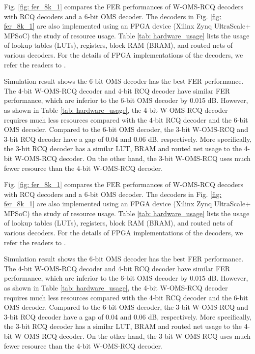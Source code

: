 \documentclass [PhD] {uclathes}
\begin{document}
Fig. \ref{fig: fer_8k_1} compares the FER performances of W-OMS-RCQ decoders with RCQ decoders and a 6-bit OMS decoder. The decoders in Fig. \ref{fig: fer_8k_1} are also implemented using an FPGA device (Xilinx Zynq
UltraScale+ MPSoC) the study of resource usage. Table \ref{tab: hardware_usage} lists the usage of lookup tables (LUTs), registers, block RAM (BRAM), and routed nets of various decoders. For the details of FPGA implementations of the decoders, we refer the readers to \cite{terrill2021fpga}. 

Simulation result shows the 6-bit OMS decoder has the best FER performance. The 4-bit W-OMS-RCQ decoder and 4-bit RCQ decoder have similar FER performance, which are inferior to the 6-bit OMS decoder by 0.015 dB. However, as shown in Table \ref{tab: hardware_usage}, the 4-bit W-OMS-RCQ decoder requires much less resources compared with the 4-bit RCQ decoder and the 6-bit OMS decoder. Compared to the 6-bit OMS decoder, the 3-bit W-OMS-RCQ and 3-bit RCQ decoder have a gap of 0.04 and 0.06 dB, respectively. More specifically, the 3-bit RCQ decoder has a similar LUT, BRAM and routed net usage to the 4-bit W-OMS-RCQ decoder. On the other hand, the 3-bit W-OMS-RCQ uses much fewer resource than the 4-bit W-OMS-RCQ decoder.




Fig. \ref{fig: fer_8k_1} compares the FER performances of W-OMS-RCQ decoders with RCQ decoders and a 6-bit OMS decoder. The decoders in Fig. \ref{fig: fer_8k_1} are also implemented using an FPGA device (Xilinx Zynq
UltraScale+ MPSoC) the study of resource usage. Table \ref{tab: hardware_usage} lists the usage of lookup tables (LUTs), registers, block RAM (BRAM), and routed nets of various decoders. For the details of FPGA implementations of the decoders, we refer the readers to \cite{terrill2021fpga}. 

Simulation result shows the 6-bit OMS decoder has the best FER performance. The 4-bit W-OMS-RCQ decoder and 4-bit RCQ decoder have similar FER performance, which are inferior to the 6-bit OMS decoder by 0.015 dB. However, as shown in Table \ref{tab: hardware_usage}, the 4-bit W-OMS-RCQ decoder requires much less resources compared with the 4-bit RCQ decoder and the 6-bit OMS decoder. Compared to the 6-bit OMS decoder, the 3-bit W-OMS-RCQ and 3-bit RCQ decoder have a gap of 0.04 and 0.06 dB, respectively. More specifically, the 3-bit RCQ decoder has a similar LUT, BRAM and routed net usage to the 4-bit W-OMS-RCQ decoder. On the other hand, the 3-bit W-OMS-RCQ uses much fewer resource than the 4-bit W-OMS-RCQ decoder.
\end{document}
